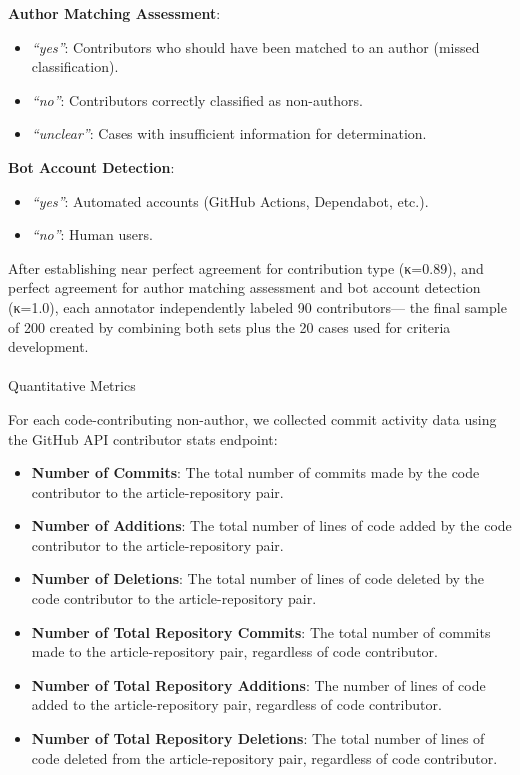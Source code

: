 \documentclass[
  letterpaper,
  DIV=11,
  numbers=noendperiod]{scrartcl}
\makeatletter
\let\oldparagraph\paragraph
\renewcommand{\paragraph}{
    \@ifstar
      \xxxParagraphStar
      \xxxParagraphNoStar
  }
\newcommand{\xxxParagraphStar}[1]{\oldparagraph*{#1}\mbox{}}
\newcommand{\xxxParagraphNoStar}[1]{\oldparagraph{#1}\mbox{}}
\providecommand{\tightlist}{%
  \setlength{\itemsep}{0pt}\setlength{\parskip}{0pt}}
\makeatother
\begin{document}
\textbf{Author Matching Assessment}:

\begin{itemize}
\tightlist
\item
  \emph{``yes''}: Contributors who should have been matched to an author
  (missed classification).
\item
  \emph{``no''}: Contributors correctly classified as non-authors.
\item
  \emph{``unclear''}: Cases with insufficient information for
  determination.
\end{itemize}

\textbf{Bot Account Detection}:

\begin{itemize}
\tightlist
\item
  \emph{``yes''}: Automated accounts (GitHub Actions, Dependabot, etc.).
\item
  \emph{``no''}: Human users.
\end{itemize}

After establishing near perfect agreement for contribution type
(κ=0.89), and perfect agreement for author matching assessment and bot
account detection (κ=1.0), each annotator independently labeled 90
contributors--- the final sample of 200 created by combining both sets
plus the 20 cases used for criteria development.

\paragraph{Quantitative Metrics}\label{quantitative-metrics}

For each code-contributing non-author, we collected commit activity data
using the GitHub API contributor stats endpoint:

\begin{itemize}
\tightlist
\item
  \textbf{Number of Commits}: The total number of commits made by the
  code contributor to the article-repository pair.
\item
  \textbf{Number of Additions}: The total number of lines of code added
  by the code contributor to the article-repository pair.
\item
  \textbf{Number of Deletions}: The total number of lines of code
  deleted by the code contributor to the article-repository pair.
\item
  \textbf{Number of Total Repository Commits}: The total number of
  commits made to the article-repository pair, regardless of code
  contributor.
\item
  \textbf{Number of Total Repository Additions}: The number of lines of
  code added to the article-repository pair, regardless of code
  contributor.
\item
  \textbf{Number of Total Repository Deletions}: The total number of
  lines of code deleted from the article-repository pair, regardless of
  code contributor.
\end{itemize}
\end{document}
